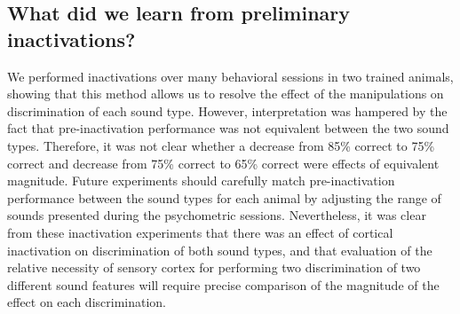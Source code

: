 


\subsection{What did we learn from preliminary inactivations?}
We performed inactivations over many behavioral sessions in two trained animals, showing that this method allows us to resolve the effect of the manipulations on discrimination of each sound type. 
%
However, interpretation was hampered by the fact that pre-inactivation performance was not equivalent between the two sound types. 
%
Therefore, it was not clear whether a decrease from 85\% correct to 75\% correct and decrease from 75\% correct to 65\% correct were effects of equivalent magnitude. 
% 
Future experiments should carefully match pre-inactivation performance between the sound types for each animal by adjusting the range of sounds presented during the psychometric sessions.
%
Nevertheless, it was clear from these inactivation experiments that there was an effect of cortical inactivation on discrimination of both sound types, and that evaluation of the relative necessity of sensory cortex for performing two discrimination of two different sound features will require precise comparison of the magnitude of the effect on each discrimination.

